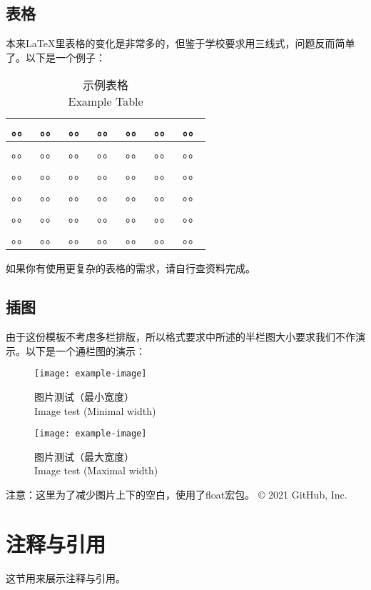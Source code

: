 \subsection{表格}
\par 本来LaTeX里表格的变化是非常多的，但鉴于学校要求用三线式，问题反而简单了。以下是一个例子：
\begin{table}[htbp]\center
    \caption{示例表格\\Example Table}
    \begin{tabular}{lcccccl}
     \toprule
     。。 & 。。 & 。。 & 。。 & 。。& 。。 & 。。\\
     \midrule
    。。 & 。。 & 。。 & 。。 & 。。& 。。 & 。。\\
    。。 & 。。 & 。。 & 。。 & 。。& 。。 & 。。\\
    。。 & 。。 & 。。 & 。。 & 。。& 。。 & 。。\\
    。。 & 。。 & 。。 & 。。 & 。。& 。。 & 。。\\
    。。 & 。。 & 。。 & 。。 & 。。& 。。 & 。。\\
     \bottomrule
    \end{tabular}
   \end{table}
如果你有使用更复杂的表格的需求，请自行查资料完成。

\subsection{插图}
由于这份模板不考虑多栏排版，所以格式要求中所述的半栏图大小要求我们不作演示。以下是一个通栏图的演示：
\begin{figure}[H]
    \centering
    \texttt{[image: example-image]}
    \caption{图片测试（最小宽度）\\Image test (Minimal width)}
  \end{figure}

\begin{figure}[H]
    \centering
    \texttt{[image: example-image]}
    \caption{图片测试（最大宽度）\\Image test (Maximal width)}
\end{figure}
\par 注意：这里为了减少图片上下的空白，使用了float宏包。
© 2021 GitHub, Inc.


\section{注释与引用}这节用来展示注释与引用。

